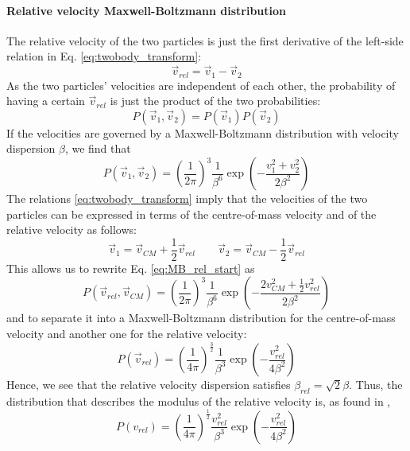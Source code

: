 \begin{appendices}
\paragraph{Relative velocity Maxwell-Boltzmann distribution}
The relative velocity of the two particles is just the first derivative of the left-side relation in Eq. \eqref{eq:twobody_transform}:
\begin{equation}
	\vec{v}_{rel} = \vec{v}_1 - \vec{v}_2
\end{equation}
As the two particles' velocities are independent of each other, the probability of having a certain \(\vec{v}_{rel} \) is just the product of the two probabilities:
\begin{equation}
	P(\vec{v}_1, \vec{v}_2) = P(\vec{v}_1)P(\vec{v}_2)
\end{equation}
If the velocities are governed by a Maxwell-Boltzmann distribution with velocity dispersion \(\beta \), we find that
\begin{equation}\label{eq:MB_rel_start}
	P(\vec{v}_1, \vec{v}_2) = \left( \frac{1}{2\pi } \right)^3 \frac{1}{\beta ^6} \exp \left( -\frac{v_1^2 + v_2^2}{2\beta ^2} \right)  
\end{equation}
The relations \eqref{eq:twobody_transform} imply that the velocities of the two particles can be expressed in terms of the centre-of-mass velocity and of the relative velocity as follows:
\begin{equation}
	\vec{v}_1 = \vec{v}_{CM} + \frac{1}{2} \vec{v}_{rel}
	\qquad
	\vec{v}_2 = \vec{v}_{CM} - \frac{1}{2} \vec{v}_{rel} 
\end{equation}
This allows us to rewrite Eq. \eqref{eq:MB_rel_start} as
\begin{equation}
	P(\vec{v}_{rel} , \vec{v}_{CM} ) = \left( \frac{1}{2\pi } \right)^3 \frac{1}{\beta ^6} \exp \left( - \frac{2 v_{CM} ^2 + \frac{1}{2}v_{rel} ^2}{2\beta ^2} \right)  
\end{equation}
and to separate it into a Maxwell-Boltzmann distribution for the centre-of-mass velocity and another one for the relative velocity:
\begin{equation}
	P(\vec{v}_{rel} ) = \left( \frac{1}{4\pi } \right)^{\frac{3}{2}} \frac{1}{\beta ^3} \exp \left( - \frac{v_{rel} ^2}{4\beta ^2} \right)  
\end{equation}
Hence, we see that the relative velocity dispersion satisfies \(\beta _{rel}=\sqrt{2} \beta \). Thus, the distribution that describes the modulus of the relative velocity is, as found in \cite{Ferrer_2013},
\begin{equation}
	P(v_{rel} ) = \left( \frac{1}{4\pi } \right) ^{\frac{1}{2}} \frac{v_{rel} ^2}{\beta ^3} \exp \left( - \frac{v_{rel} ^2}{4\beta ^2} \right)  
\end{equation}

\end{appendices}